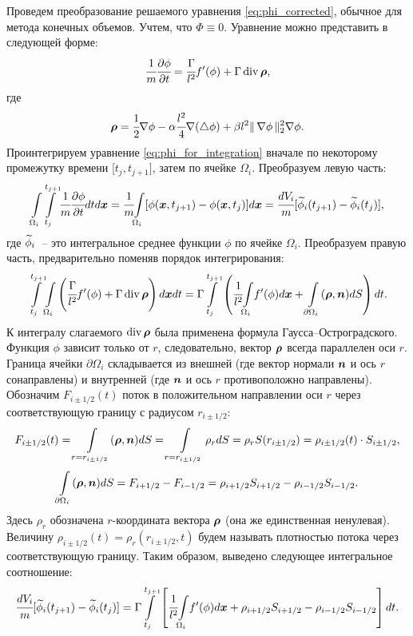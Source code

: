 Проведем преобразование решаемого уравнения \eqref{eq:phi_corrected}, обычное для метода конечных объемов. Учтем, что $\Phi \equiv 0$. Уравнение можно представить в следующей форме:
\begin{equation}
	\cfrac{1}{m} \cfrac{\partial \phi}{\partial t} = \cfrac{\Gamma}{l^2} f'(\phi) + \Gamma \operatorname{{div}} {\boldsymbol{\rho}} {\text{,}}
	\label{eq:phi_for_integration}
\end{equation}
где
\begin{equation}
	{\boldsymbol{\rho}} = \cfrac{1}{2} \nabla \phi - \alpha \cfrac{l^2}{4} \nabla (\triangle \phi) + \beta l^2 \| \, \nabla \phi \, \|_2^2 \nabla \phi {\text{.}}
	\label{eq:rho}
\end{equation}
Проинтегрируем уравнение \eqref{eq:phi_for_integration} вначале по некоторому промежутку времени [$t_j, t_{j + 1}]$, затем по ячейке $\Omega_i$. Преобразуем левую часть:
$${\int\limits_{\Omega_i}} {\int\limits_{t_j}^{t_{j + 1}}} \cfrac{1}{m} \cfrac{\partial \phi}{\partial t} dt d {\boldsymbol{x}} = \cfrac{1}{m} {\int\limits_{\Omega_i}} [\phi({\boldsymbol{x}}, t_{j + 1}) - \phi({\boldsymbol{x}}, t_j)] d {\boldsymbol{x}} = \cfrac{dV_i}{m} [{\widetilde{\phi}}_i(t_{j + 1}) - {\widetilde{\phi}}_i(t_j)] {\text{,}}$$
где ${\widetilde{\phi}}_i$~-- это интегральное среднее функции $\phi$ по ячейке $\Omega_i$. Преобразуем правую часть, предварительно поменяв порядок интегрирования:
$${\int\limits_{t_j}^{t_{j + 1}}} {\int\limits_{\Omega_i}} \left( \cfrac{\Gamma}{l^2} f'(\phi) + \Gamma \operatorname{{div}} {\boldsymbol{\rho}} \right) d {\boldsymbol{x}} dt = \Gamma {\int\limits_{t_j}^{t_{j + 1}}} \left( \cfrac{1}{l^2} {\int\limits_{\Omega_i}} f'(\phi) d {\boldsymbol{x}} + \int\limits_{\partial \Omega_i} ({\boldsymbol{\rho}}, {\boldsymbol{n}}) dS \right) dt {\text{.}}$$
К интегралу слагаемого $\operatorname{{div}} {\boldsymbol{\rho}}$ была применена формула Гаусса--Остроград\-ского. Функция $\phi$ зависит только от $r$, следовательно, вектор ${\boldsymbol{\rho}}$ всегда параллелен оси $r$. Граница ячейки $\partial \Omega_i$ складывается из внешней (где вектор нормали ${\boldsymbol{n}}$ и ось $r$ сонаправлены) и внутренней (где ${\boldsymbol{n}}$ и ось $r$ противоположно направлены). Обозначим $F_{i \pm 1/2}(t)$ поток в положительном направлении оси $r$ через соответствующую границу с радиусом $r_{i \pm 1/2}$:
$$F_{i \pm 1/2}(t) = \int\limits_{r = r_{i \pm 1/2}} ({\boldsymbol{\rho}}, {\boldsymbol{n}}) dS = \int\limits_{r = r_{i \pm 1/2}} \rho_r dS = \rho_r S(r_{i \pm 1/2}) = \rho_{i \pm 1/2}(t) \cdot S_{i \pm 1/2} {\text{,}}$$
$$\int\limits_{\partial \Omega_i} ({\boldsymbol{\rho}}, {\boldsymbol{n}}) dS = F_{i + 1/2} - F_{i - 1/2} = \rho_{i + 1/2} S_{i + 1/2} - \rho_{i - 1/2} S_{i - 1/2} {\text{.}}$$
Здесь $\rho_r$ обозначена $r$-координата вектора ${\boldsymbol{\rho}}$ (она же единственная ненулевая). Величину $\rho_{i \pm 1/2}(t) = \rho_r(r_{i \pm 1/2}, t)$ будем называть плотностью потока через соответствующую границу. Таким образом, выведено следующее интегральное соотношение:
\begin{equation}
	\cfrac{dV_i}{m} [{\widetilde{\phi}}_i(t_{j + 1}) - {\widetilde{\phi}}_i(t_j)] = \Gamma {\int\limits_{t_j}^{t_{j + 1}}} \left[ \cfrac{1}{l^2} {\int\limits_{\Omega_i}} f'(\phi) d {\boldsymbol{x}} + \rho_{i + 1/2} S_{i + 1/2} - \rho_{i - 1/2} S_{i - 1/2} \right] dt {\text{.}}
	\label{eq:finite_volume_integral}
\end{equation}

